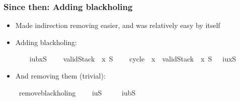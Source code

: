 \documentclass{beamer}
\begin{document}
\begin{frame}
\frametitle{Since then: Adding blackholing}
\begin{itemize}
\item Made indirection removing easier, and was relatively easy by itself
\item Adding blackholing:
\begin{isabelle}
\isamarkupfalse%
\isanewline
\ \ \ {\isachardoublequoteopen}{\isasymGamma}\ {\isasymDown}\isactrlsup i\isactrlsup u\isactrlsup b\isactrlbsub x{\isacharhash}S\isactrlesub \ {\isasymDelta}{\isachardoublequoteclose}\isanewline
\ \ \ {\isachardoublequoteopen}validStack\ {\isasymGamma}\ x\ S{\isachardoublequoteclose}\isanewline
\ \ \ {\isachardoublequoteopen}{\isasymnot}\ cycle\ {\isasymGamma}\ x{\isachardoublequoteclose}\ \ {\isachardoublequoteopen}validStack\ {\isasymDelta}\ x\ S{\isachardoublequoteclose}\ \ {\isachardoublequoteopen}{\isasymGamma}\ {\isasymDown}\isactrlsup i\isactrlsup u\isactrlsup {\isasymsurd}\isactrlbsub x{\isacharhash}S\isactrlesub \ {\isasymDelta}{\isachardoublequoteclose}
\end{isabelle}
\item And removing them (trivial):
\begin{isabelle}
\isamarkupfalse%
\ remove{\isacharunderscore}blackholing{\isacharcolon}\isanewline
\ \ \ {\isachardoublequoteopen}{\isasymGamma}\ {\isasymDown}\isactrlsup i\isactrlsup u\isactrlsup {\isasymsurd}\isactrlbsub S\isactrlesub \ {\isasymDelta}{\isachardoublequoteclose}\isanewline
\ \ \ {\isachardoublequoteopen}{\isasymGamma}\ {\isasymDown}\isactrlsup i\isactrlsup u\isactrlsup b\isactrlbsub S\isactrlesub \ {\isasymDelta}{\isachardoublequoteclose}\isanewline
\end{isabelle}
\end{itemize}
\end{frame}
\end{document}
